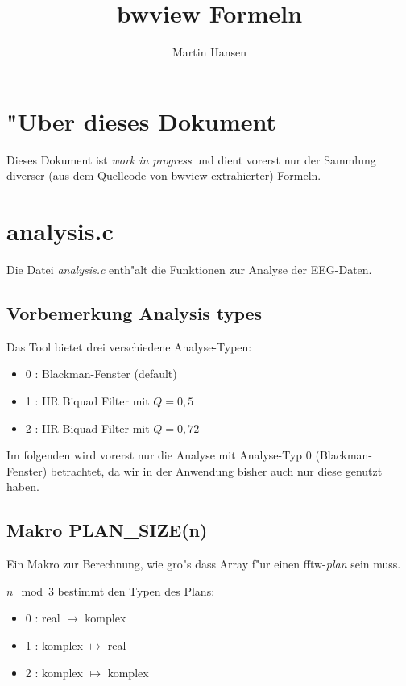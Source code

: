 \documentclass[12pt]{amsart}
\title{bwview Formeln}
\author{Martin Hansen}
\begin{document}

\renewcommand{\baselinestretch}{1.50}\normalsize

\section{"Uber dieses Dokument}

Dieses Dokument ist \emph{work in progress} und dient vorerst nur der Sammlung diverser (aus dem Quellcode von bwview extrahierter) Formeln.

\section{analysis.c}

Die Datei \emph{analysis.c} enth"alt die Funktionen zur Analyse der EEG-Daten.


\subsection{Vorbemerkung Analysis types} Das Tool bietet drei verschiedene Analyse-Typen:

\begin{itemize}
\item 0 : Blackman-Fenster (default)
\item 1 : IIR Biquad Filter mit $Q=0,5$
\item 2 : IIR Biquad Filter mit $Q=0,72$
\end{itemize} 
Im folgenden wird vorerst nur die Analyse mit Analyse-Typ 0 (Blackman-Fenster) betrachtet, da wir in der Anwendung bisher auch nur diese genutzt haben.


\subsection{Makro PLAN\_SIZE(n)} Ein Makro zur Berechnung, wie gro"s dass Array f"ur einen fftw-\emph{plan} sein muss. 

$n \mod 3$ bestimmt den Typen des Plans: 

\begin{itemize}
\item 0 : real $\mapsto$ komplex
\item 1 : komplex $\mapsto$ real
\item 2 : komplex $\mapsto$ komplex
\end{itemize} 
\end{document}
